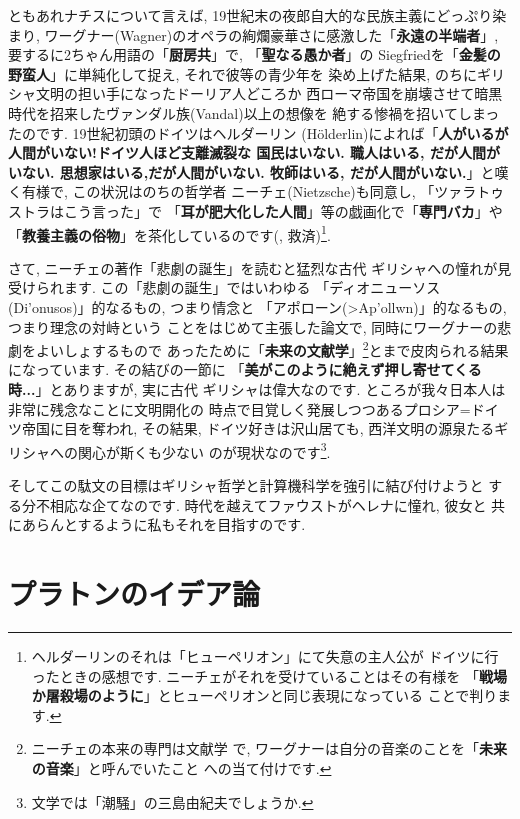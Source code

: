 ともあれナチスについて言えば, 19世紀末の夜郎自大的な民族主義にどっぷり染まり,
 ワーグナー(Wagner)のオペラの絢爛豪華さに感激した「\textbf{永遠の半端者}」,
 要するに2ちゃん用語の「\textbf{厨房共}」で, 「\textbf{聖なる愚か者}」の
Siegfriedを「\textbf{金髪の野蛮人}」に単純化して捉え, それで彼等の青少年を
染め上げた結果, のちにギリシャ文明の担い手になったドーリア人どころか
西ローマ帝国を崩壊させて暗黒時代を招来したヴァンダル族(Vandal)以上の想像を
絶する惨禍を招いてしまったのです. 19世紀初頭のドイツはヘルダーリン
(H\"olderlin)によれば「\textbf{人がいるが人間がいない!ドイツ人ほど支離滅裂な
国民はいない. 職人はいる, だが人間がいない. 思想家はいる,だが人間がいない.
 牧師はいる, だが人間がいない.}」と嘆く有様で,  この状況はのちの哲学者
 ニーチェ(Nietzsche)も同意し, 「ツァラトゥストラはこう言った」で
 「\textbf{耳が肥大化した人間}」等の戯画化で「\textbf{専門バカ}」や
「\textbf{教養主義の俗物}」を茶化しているのです(\cite{ツァラトゥストラ},
救済)\footnote{ヘルダーリンのそれは「ヒューペリオン」にて失意の主人公が
ドイツに行ったときの感想です. ニーチェがそれを受けていることはその有様を
「\textbf{戦場か屠殺場のように}」とヒューペリオンと同じ表現になっている
ことで判ります.}.
\newline

さて, ニーチェの著作「悲劇の誕生」\cite{悲劇の誕生}を読むと猛烈な古代
ギリシャへの憧れが見受けられます. この「悲劇の誕生」ではいわゆる
「ディオニューソス(\textgreek{Di'onusos})」的なるもの, つまり情念と
「アポローン(\textgreek{>Ap'ollwn})」的なるもの, つまり理念の対峙という
ことをはじめて主張した論文で, 同時にワーグナーの悲劇をよいしょするもので
あったために「\textbf{未来の文献学}」\footnote{ニーチェの本来の専門は文献学
で, ワーグナーは自分の音楽のことを「\textbf{未来の音楽}」と呼んでいたこと
への当て付けです.}とまで皮肉られる結果になっています. その結びの一節に
「\textbf{美がこのように絶えず押し寄せてくる時...}」とありますが, 実に古代
ギリシャは偉大なのです. ところが我々日本人は非常に残念なことに文明開化の
時点で目覚しく発展しつつあるプロシア=ドイツ帝国に目を奪われ, その結果,
 ドイツ好きは沢山居ても, 西洋文明の源泉たるギリシャへの関心が斯くも少ない
のが現状なのです\footnote{文学では「潮騒」の三島由紀夫でしょうか.}.
\newline

そしてこの駄文の目標はギリシャ哲学と計算機科学を強引に結び付けようと
する分不相応な企てなのです. 時代を越えてファウストがヘレナに憧れ, 彼女と
共にあらんとするように私もそれを目指すのです. 

\section{プラトンのイデア論}


